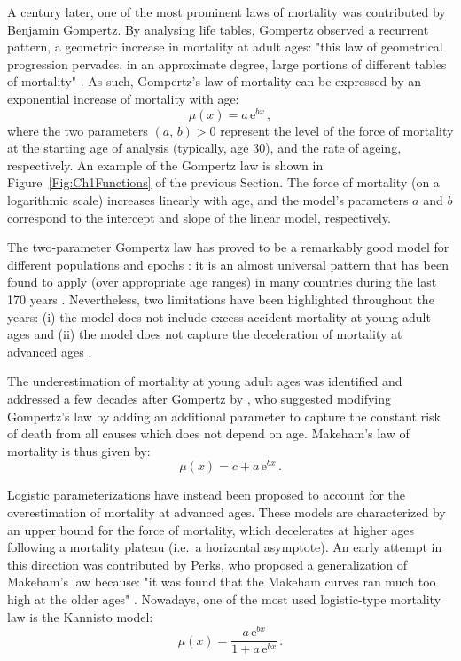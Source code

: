 \documentclass[Thesis]{subfiles}
\begin{document}
A century later, one of the most prominent laws of mortality was contributed by Benjamin Gompertz. By analysing life tables, Gompertz observed a recurrent pattern, a geometric increase in mortality at adult ages: "this law of geometrical progression pervades, in an approximate degree, large portions of different tables of mortality" \cite[][p.~514]{gompertz1825nature}. As such, Gompertz's law of mortality can be expressed by an exponential increase of mortality with age:
%
\begin{equation}\label{Eq:Ch1Gompertz}
\mu(x)= a\, \mathrm{e}^{bx} \,,
\end{equation}
%
where the two parameters $(a,\,b) > 0$ represent the level of the force of mortality at the starting age of analysis (typically, age 30), and the rate of ageing, respectively. An example of the Gompertz law is shown in Figure~\ref{Fig:Ch1Functions} of the previous Section. The force of mortality (on a logarithmic scale) increases linearly with age, and the model's parameters $a$ and $b$ correspond to the intercept and slope of the linear model, respectively.  

The two-parameter Gompertz law has proved to be a remarkably good model for different populations and epochs \citep{forfar2004mortality}: it is an almost universal pattern that has been found to apply (over appropriate age ranges) in many countries during the last 170 years \citep{thatcher1998force}. Nevertheless, two limitations have been highlighted throughout the years: (i) the model does not include excess accident mortality at young adult ages and (ii) the model does not capture the deceleration of mortality at advanced ages \citep{manton1993forecasting,vaupel1998biodemographic}. 

The underestimation of mortality at young adult ages was identified and addressed a few decades after Gompertz by \cite{makeham1860law}, who suggested modifying Gompertz's law by adding an additional parameter to capture the constant risk of death from all causes which does not depend on age. Makeham's law of mortality is thus given by:
%
\begin{equation}\label{Eq:Ch1Make}
\mu(x)= c + a\, \mathrm{e}^{bx} \,.
\end{equation}
%

Logistic parameterizations have instead been proposed to account for the overestimation of mortality at advanced ages. These models are characterized by an upper bound for the force of mortality, which decelerates at higher ages following a mortality plateau  (i.e.~a horizontal asymptote). An early attempt in this direction was contributed by Perks, who proposed a generalization of Makeham's law because: "it was found that the Makeham curves ran much too high at the older ages" \cite[][p.~13]{perks1932some}. Nowadays, one of the most used logistic-type mortality law is the Kannisto model:
%
\begin{equation}\label{Eq:Ch1Kann}
\mu(x)= \frac{a\, \mathrm{e}^{bx}}{1 + a\, \mathrm{e}^{bx}} \,.
\end{equation}
%
\end{document}
